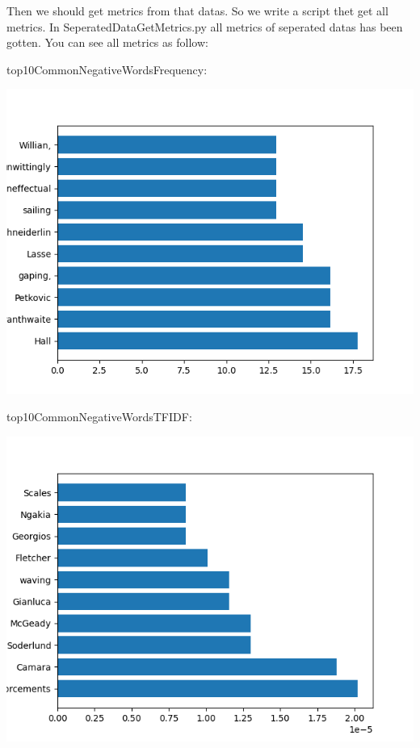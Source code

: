 \documentclass{article}
\begin{document}
Then we should get metrics from that datas. So we write a script thet get all metrics. In SeperatedDataGetMetrics.py all metrics of seperated datas
has been gotten. You can see all metrics as follow:


top10CommonNegativeWordsFrequency:
\begin{center}
    \includegraphics{top10CommonNegativeWordsFrequency}
\end{center}

top10CommonNegativeWordsTFIDF:
\begin{center}
    \includegraphics{top10CommonNegativeWordsTFIDF}
\end{center}
\end{document}
